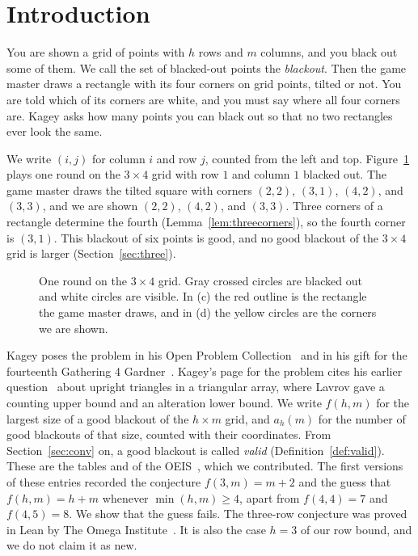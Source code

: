 \section{Introduction}\label{sec:intro}

You are shown a grid of points with $h$ rows and $m$ columns, and you black out some
of them. We call the set of blacked-out points the \emph{blackout}. Then the game master
draws a rectangle with its four corners on grid points, tilted or not. You are told which
of its corners are white, and you must say where all four corners are. Kagey asks how many
points you can black out so that no two rectangles ever look the same.

We write $(i,j)$ for column $i$ and row $j$, counted from the left and top.
Figure~\ref{fig:game} plays one round on the $3\times4$ grid with row $1$ and column $1$
blacked out. The game master draws the tilted square with corners
$(2,2)$, $(3,1)$, $(4,2)$, and $(3,3)$, and we are shown $(2,2)$, $(4,2)$, and $(3,3)$.
Three corners of a rectangle determine the fourth (Lemma~\ref{lem:threecorners}), so the
fourth corner is $(3,1)$. This blackout of six points is good, and no good blackout of the
$3\times4$ grid is larger (Section~\ref{sec:three}).

\begin{figure}[t]
\centering
\resizebox{\textwidth}{!}{}
\caption{One round on the $3\times4$ grid. Gray crossed circles are blacked out and white
circles are visible. In (c) the red outline is the rectangle the game master draws, and in (d)
the yellow circles are the corners we are shown.}
\label{fig:game}
\end{figure}

Kagey poses the problem in his Open Problem Collection~\cite{kagey001} and in his gift
for the fourteenth Gathering 4 Gardner~\cite{kageyG4G14}. Kagey's page for the problem
cites his earlier question~\cite{kageyMSE} about upright triangles in a triangular array,
where Lavrov gave a counting upper bound and an alteration lower bound. We write $f(h,m)$ for the
largest size of a good blackout of the $h\times m$ grid, and $a_h(m)$ for the number of
good blackouts of that size, counted with their coordinates. From Section~\ref{sec:conv} on, a
good blackout is called \emph{valid} (Definition~\ref{def:valid}). These are the tables
 and  of the OEIS~\cite{oeis}, which we contributed. The
first versions of these entries recorded the conjecture $f(3,m)=m+2$ and the guess that $f(h,m)=h+m$
whenever $\min(h,m)\ge4$, apart from $f(4,4)=7$ and $f(4,5)=8$. We show that the guess
fails. The three-row conjecture was proved in Lean by
The Omega Institute~\cite{trureturing2026}. It is also the case $h=3$ of our row bound,
and we do not claim it as new.

